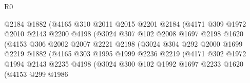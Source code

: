 \begin{lexlean}{R0}
\begin{coremodule}
                              @2184
                              @1882
                              (@4165
                                @310
                                @2011
                                @2015
                                @2201
                                @2184
                                (@4171
                                  @309
                                  @1972
                                  @2010
                                  @2143
                                  @2200
                                  @4198
                                  (@3024
                                    @307
                                    @102
                                    @2008
                                    @1697
                                    @2198
                                    @1620
                                    (@4153
                                      @306
                                      @2002
                                      @2007
                                      @2221
                                      @2198
                                      (@3024
                                        @304
                                        @292
                                        @2000
                                        @1699
                                        @2219
                                        @1882
                                        (@4165
                                          @303
                                          @1995
                                          @1999
                                          @2236
                                          @2219
                                          (@4171
                                            @302
                                            @1972
                                            @1994
                                            @2143
                                            @2235
                                            @4198
                                            (@3024
                                              @300
                                              @102
                                              @1992
                                              @1697
                                              @2233
                                              @1620
                                              (@4153
                                                @299
                                                @1986

\end{coremodule}
\end{lexlean}
